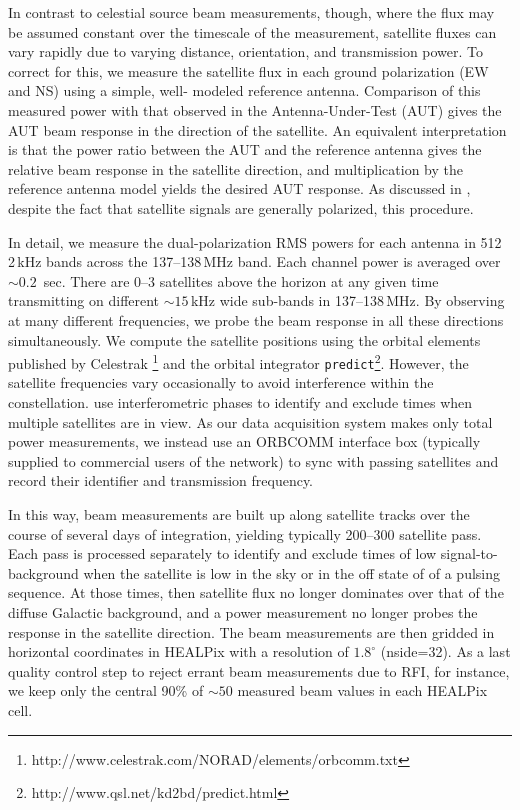 \documentclass{emulateapj}
\begin{document}
In contrast to celestial source beam measurements, though, where the flux may be 
assumed constant over the timescale of the measurement, satellite fluxes can vary rapidly 
due to varying distance, orientation, and transmission power. To correct for this, we 
measure the satellite flux in each ground polarization (EW and NS) using a simple, well-
modeled reference antenna. Comparison of this measured power with that observed in the 
Antenna-Under-Test (AUT) gives the AUT beam response in the direction of the satellite. 
An equivalent interpretation is that the power ratio between the AUT and the reference 
antenna gives the relative beam response in the satellite direction, and multiplication by 
the reference antenna model yields the desired AUT response. As discussed in 
\citet{neben15}, despite the fact that satellite signals are generally polarized, this 
procedure.

In detail, we measure the dual-polarization RMS powers for each antenna in 512 2\,kHz 
bands across the 137--138\,MHz band. Each channel power is averaged over $\sim0.2$
\,sec. There are 0--3 satellites above the horizon at any given time transmitting on different 
$\sim15$\,kHz wide sub-bands in 137--138\,MHz. By observing at many different 
frequencies, we probe the beam response in all these directions simultaneously. We 
compute the satellite positions using the orbital elements published by Celestrak
\footnote{http://www.celestrak.com/NORAD/elements/orbcomm.txt} and the orbital 
integrator \texttt{predict}\footnote{http://www.qsl.net/kd2bd/predict.html}. However, the 
satellite frequencies vary occasionally to avoid interference within the constellation. 
\citet{zheng14} use interferometric phases to identify and exclude times when multiple 
satellites are in view. As our data acquisition system makes only total power 
measurements, we instead use an ORBCOMM interface box (typically supplied to 
commercial users of the network) to sync with passing satellites and record their identifier 
and transmission frequency.

In this way, beam measurements are built up along satellite tracks over the course of 
several days of integration, yielding typically 200--300 satellite pass. Each pass is 
processed separately to identify and exclude times of low signal-to-background when the 
satellite is low in the sky or in the off state of of a pulsing sequence. At those times, then 
satellite flux no longer dominates over that of the diffuse Galactic background, and a 
power measurement no longer probes the response in the satellite direction. The beam 
measurements are then gridded in horizontal coordinates in HEALPix with a resolution of 
$1.8^\circ$ (nside=32). As a last quality control step to reject errant beam measurements 
due to RFI, for instance, we keep only the central 90\% of $\sim50$ measured beam 
values in each HEALPix cell.
\end{document}
